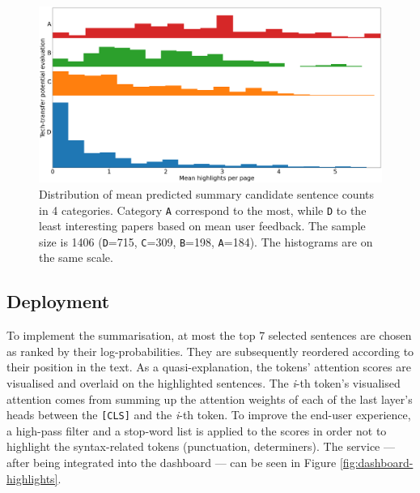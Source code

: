 \begin{figure}
    \centering
    \includegraphics[width=0.85\linewidth]{figures/highlights-histograms.png}
    \captionsetup{width=.9\linewidth}
    \caption{Distribution of mean predicted summary candidate sentence counts in 4 categories. Category \texttt{A} correspond to the most, while \texttt{D} to the least interesting papers based on mean user feedback. The sample size is 1406 (\texttt{D}=715, \texttt{C}=309, \texttt{B}=198, \texttt{A}=184). The histograms are on the same scale.}
    \label{fig:histograms}
\end{figure}

\subsection{Deployment}

To implement the summarisation, at most the top 7 selected sentences are chosen as ranked by their log-probabilities. They are subsequently reordered according to their position in the text. As a quasi-explanation, the tokens' attention scores are visualised and overlaid on the highlighted sentences. The \textit{i}-th token's visualised attention comes from summing up the attention weights of each of the last layer's heads between the \texttt{[CLS]} and the \textit{i}-th token. To improve the end-user experience, a high-pass filter and a stop-word list is applied to the scores in order not to highlight the syntax-related tokens (punctuation, determiners). The service --- after being integrated into the dashboard --- can be seen in Figure \ref{fig:dashboard-highlights}.

